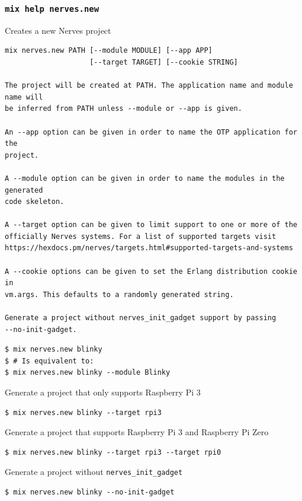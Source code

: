 \documentclass[10pt,xcolor=pdflatex,dvipsnames,table]{beamer}
\begin{document}
\begin{frame}[fragile]
\frametitle{\texttt{mix help nerves.new}}
Creates a new Nerves project

\begin{overprint}
\begin{verbatim}
mix nerves.new PATH [--module MODULE] [--app APP]
                    [--target TARGET] [--cookie STRING]

The project will be created at PATH. The application name and module name will
be inferred from PATH unless --module or --app is given.

An --app option can be given in order to name the OTP application for the
project.

A --module option can be given in order to name the modules in the generated
code skeleton.

A --target option can be given to limit support to one or more of the
officially Nerves systems. For a list of supported targets visit
https://hexdocs.pm/nerves/targets.html#supported-targets-and-systems

A --cookie options can be given to set the Erlang distribution cookie in
vm.args. This defaults to a randomly generated string.

Generate a project without nerves_init_gadget support by passing
--no-init-gadget.
\end{verbatim}


\begin{verbatim}
$ mix nerves.new blinky
$ # Is equivalent to:
$ mix nerves.new blinky --module Blinky
\end{verbatim}

Generate a project that only supports Raspberry Pi 3

\begin{verbatim}
$ mix nerves.new blinky --target rpi3
\end{verbatim}

Generate a project that supports Raspberry Pi 3 and Raspberry Pi Zero

\begin{verbatim}
$ mix nerves.new blinky --target rpi3 --target rpi0
\end{verbatim}

Generate a project without \texttt{nerves\_init\_gadget}

\begin{verbatim}
$ mix nerves.new blinky --no-init-gadget
\end{verbatim}
\end{overprint}
\end{frame}
\end{document}
